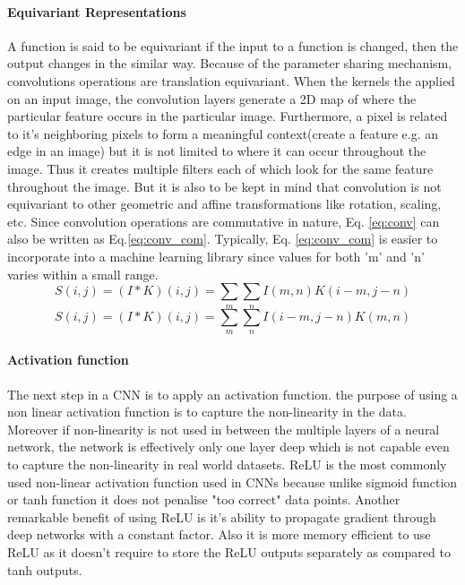 {\paragraph{Equivariant Representations} 
A function is said to be equivariant if the input to a function is changed, then the output changes in the similar way. Because of the parameter sharing mechanism, convolutions operations are translation equivariant. When the kernels the applied on an input image, the convolution layers generate a 2D map of where the particular feature occurs in the particular image. Furthermore, a pixel is related to it's neighboring pixels to form a meaningful context(create a feature e.g. an edge in an image) but it is not limited to where it can occur throughout the image. Thus it creates multiple filters each of which look for the same feature throughout the image. But it is also to be kept in mind that convolution is not equivariant to other geometric and affine transformations like rotation, scaling, etc. 
 Since convolution operations are commutative in nature, Eq. \ref{eq:conv} can also be written as Eq.\ref{eq:conv_com}. Typically, Eq. \ref{eq:conv_com} is easier to incorporate into a machine learning library since values for both 'm' and 'n' varies within a small range.\cite{Goodfellow-et-al-2016}
\begin{equation}
    \label{eq:conv}
    \mathit{S(i,j)}= \mathit{(I*K)(i,j)} = \sum_{m}\sum_{n}\mathit{I(m,n)K(i-m,j-n)}
\end{equation}
\begin{equation}
    \label{eq:conv_com}
    \mathit{S(i,j)}= \mathit{(I*K)(i,j)} = \sum_{m}\sum_{n}\mathit{I(i-m,j-n)K(m,n)}
\end{equation}
\paragraph{Activation function}
The next step in a \ac{CNN} is to apply an activation function. the purpose of using a non linear activation function is to capture the non-linearity in the data. Moreover if non-linearity is not used in between the multiple layers of a neural network, the network is effectively only one layer deep which is not capable even to capture the non-linearity in real world datasets. \ac{ReLU} is the most commonly used non-linear activation function used in \ac{CNN}s because unlike sigmoid function or tanh function it does not penalise "too correct" data points. Another remarkable benefit of using \ac{ReLU} is it's ability to propagate gradient through deep networks with a constant factor. Also it is more memory efficient to use \ac{ReLU} as it doesn't require to store the \ac{ReLU} outputs separately as compared to tanh outputs.
}
